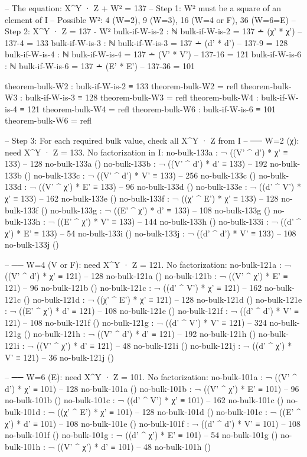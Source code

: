\documentclass[11pt,a4paper]{article}
\begin{document}
\begin{code}
-- The equation: X^Y · Z + W² = 137
-- Step 1: W² must be a square of an element of I
-- Possible W²: 4 (W=2), 9 (W=3), 16 (W=4 or F), 36 (W=6=E)
-- Step 2: X^Y · Z = 137 - W²
bulk-if-W-is-2 : ℕ
bulk-if-W-is-2 = 137 ∸ (χ' * χ')        -- 137-4 = 133
bulk-if-W-is-3 : ℕ
bulk-if-W-is-3 = 137 ∸ (d' * d')        -- 137-9 = 128
bulk-if-W-is-4 : ℕ
bulk-if-W-is-4 = 137 ∸ (V' * V')        -- 137-16 = 121
bulk-if-W-is-6 : ℕ
bulk-if-W-is-6 = 137 ∸ (E' * E')        -- 137-36 = 101

theorem-bulk-W2 : bulk-if-W-is-2 ≡ 133
theorem-bulk-W2 = refl
theorem-bulk-W3 : bulk-if-W-is-3 ≡ 128
theorem-bulk-W3 = refl
theorem-bulk-W4 : bulk-if-W-is-4 ≡ 121
theorem-bulk-W4 = refl
theorem-bulk-W6 : bulk-if-W-is-6 ≡ 101
theorem-bulk-W6 = refl
\end{code}

\begin{code}
-- Step 3: For each required bulk value, check all X^Y · Z from I
-- ── W=2 (χ): need X^Y · Z = 133. No factorization in I:
no-bulk-133a : ¬ ((V' ^ d') * χ' ≡ 133)    -- 128
no-bulk-133a ()
no-bulk-133b : ¬ ((V' ^ d') * d' ≡ 133)    -- 192
no-bulk-133b ()
no-bulk-133c : ¬ ((V' ^ d') * V' ≡ 133)    -- 256
no-bulk-133c ()
no-bulk-133d : ¬ ((V' ^ χ') * E' ≡ 133)    -- 96
no-bulk-133d ()
no-bulk-133e : ¬ ((d' ^ V') * χ' ≡ 133)    -- 162
no-bulk-133e ()
no-bulk-133f : ¬ ((χ' ^ E') * χ' ≡ 133)    -- 128
no-bulk-133f ()
no-bulk-133g : ¬ ((E' ^ χ') * d' ≡ 133)    -- 108
no-bulk-133g ()
no-bulk-133h : ¬ ((E' ^ χ') * V' ≡ 133)    -- 144
no-bulk-133h ()
no-bulk-133i : ¬ ((d' ^ χ') * E' ≡ 133)    -- 54
no-bulk-133i ()
no-bulk-133j : ¬ ((d' ^ d') * V' ≡ 133)    -- 108
no-bulk-133j ()

-- ── W=4 (V or F): need X^Y · Z = 121. No factorization:
no-bulk-121a : ¬ ((V' ^ d') * χ' ≡ 121)    -- 128
no-bulk-121a ()
no-bulk-121b : ¬ ((V' ^ χ') * E' ≡ 121)    -- 96
no-bulk-121b ()
no-bulk-121c : ¬ ((d' ^ V') * χ' ≡ 121)    -- 162
no-bulk-121c ()
no-bulk-121d : ¬ ((χ' ^ E') * χ' ≡ 121)    -- 128
no-bulk-121d ()
no-bulk-121e : ¬ ((E' ^ χ') * d' ≡ 121)    -- 108
no-bulk-121e ()
no-bulk-121f : ¬ ((d' ^ d') * V' ≡ 121)    -- 108
no-bulk-121f ()
no-bulk-121g : ¬ ((d' ^ V') * V' ≡ 121)    -- 324
no-bulk-121g ()
no-bulk-121h : ¬ ((V' ^ d') * d' ≡ 121)    -- 192
no-bulk-121h ()
no-bulk-121i : ¬ ((V' ^ χ') * d' ≡ 121)    -- 48
no-bulk-121i ()
no-bulk-121j : ¬ ((d' ^ χ') * V' ≡ 121)    -- 36
no-bulk-121j ()

-- ── W=6 (E): need X^Y · Z = 101. No factorization:
no-bulk-101a : ¬ ((V' ^ d') * χ' ≡ 101)    -- 128
no-bulk-101a ()
no-bulk-101b : ¬ ((V' ^ χ') * E' ≡ 101)    -- 96
no-bulk-101b ()
no-bulk-101c : ¬ ((d' ^ V') * χ' ≡ 101)    -- 162
no-bulk-101c ()
no-bulk-101d : ¬ ((χ' ^ E') * χ' ≡ 101)    -- 128
no-bulk-101d ()
no-bulk-101e : ¬ ((E' ^ χ') * d' ≡ 101)    -- 108
no-bulk-101e ()
no-bulk-101f : ¬ ((d' ^ d') * V' ≡ 101)    -- 108
no-bulk-101f ()
no-bulk-101g : ¬ ((d' ^ χ') * E' ≡ 101)    -- 54
no-bulk-101g ()
no-bulk-101h : ¬ ((V' ^ χ') * d' ≡ 101)    -- 48
no-bulk-101h ()
\end{code}
\end{document}
